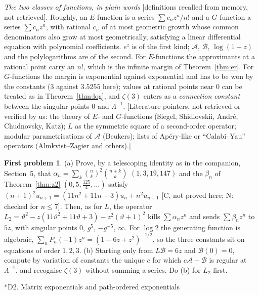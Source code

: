 \documentclass[11pt,a4paper]{article}
\makeatletter
\newcommand{\cA}{\mathcal A}
\newcommand{\cB}{\mathcal B}
\newcommand{\st}[1]{\textsf{[#1]}}
\theoremstyle{definition}
\newtheorem*{problem}{First problem}
\renewcommand\section{\@startsection{section}{1}{\z@}{-2.2ex plus -.6ex minus -.2ex}{1.1ex plus .2ex}{\normalfont\large\bfseries}}
\makeatother
\begin{document}
\emph{The two classes of functions, in plain words} \st{definitions recalled from memory, not
retrieved}. Roughly, an $E$-function is a series $\sum c_nz^n/n!$ and a $G$-function a series
$\sum c_nz^n$, with rational $c_n$ of at most geometric growth whose common denominators also grow
at most geometrically, satisfying a linear differential equation with polynomial coefficients.
$e^z$ is of the first kind; $\cA$, $\cB$, $\log(1+z)$ and the polylogarithms are of the second. For
$E$-functions the approximants at a rational point carry an $n!$, which is the infinite margin of
Theorem~\ref{thm:er}. For $G$-functions the margin is exponential against exponential and has to be
won by the constants ($3$ against $3.5255$ here); values at rational points near $0$ can be treated
as in Theorem~\ref{thm:log}, and $\zeta(3)$ enters as a \emph{connection constant} between the
singular points $0$ and $\Lambda^{-1}$.
\st{Literature pointers, not retrieved or verified by us: the theory of $E$- and $G$-functions
(Siegel, Shidlovskii, Andr\'e, Chudnovsky, Katz); $L$ as the symmetric square of a second-order
operator; modular parametrisations of $\cA$ (Beukers); lists of Ap\'ery-like or ``Calabi--Yau''
operators (Almkvist--Zagier and others).}

\begin{problem}
(a) Prove, by a telescoping identity as in the companion, Section~5, that
$\alpha_n=\sum_k\binom nk^2\binom{n+k}k$ $(1,3,19,147)$ and the $\beta_n$ of Theorem~\ref{thm:z2}
$(0,5,\frac{125}4,\dots)$ satisfy $(n+1)^2u_{n+1}=(11n^2+11n+3)u_n+n^2u_{n-1}$ \st{C, not proved
here; N: checked for $n\le7$}. Then, as for $L$, the operator
$L_2=\vartheta^2-z(11\vartheta^2+11\vartheta+3)-z^2(\vartheta+1)^2$ kills $\sum\alpha_nz^n$ and
sends $\sum\beta_nz^n$ to $5z$, with singular points $0$, $g^5$, $-g^{-5}$, $\infty$. For $\log2$ the generating function is algebraic,
$\sum_nP_n(-1)z^n=(1-6z+z^2)^{-1/2}$, so the three constants sit on equations of order $1,2,3$.
(b) Starting only from $L\cB=6z$ and $\cB(0)=0$, compute by variation of constants the unique $c$ for
which $c\cA-\cB$ is regular at $\Lambda^{-1}$, and recognise $\zeta(3)$ without summing a series.
Do (b) for $L_2$ first.
\end{problem}

\section*{D2. Matrix exponentials and path-ordered exponentials}
\end{document}

